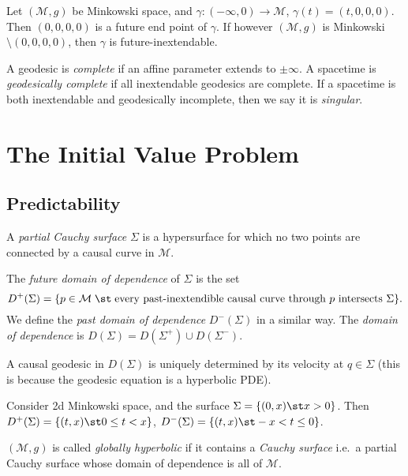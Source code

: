 \documentclass{jknotes}
\begin{document}
\begin{eg}
    Let \((\mathcal{M},g)\) be Minkowski space, and \(\gamma:(-\infty,0)\to\mathcal{M}\), \(\gamma(t)=(t,0,0,0)\). Then \((0,0,0,0)\) is a future end point of \(\gamma\). If however \((\mathcal{M},g)\) is Minkowski\(\setminus(0,0,0,0)\), then \(\gamma\) is future-inextendable.
\end{eg}

\begin{defn}
    A geodesic is \emph{complete} if an affine parameter extends to \(\pm\infty\). A spacetime is \emph{geodesically complete} if all inextendable geodesics are complete. If a spacetime is both inextendable and geodesically incomplete, then we say it is \emph{singular}.
\end{defn}

\section{The Initial Value Problem}
\subsection{Predictability}
\begin{defn}
    A \emph{partial Cauchy surface} \(\Sigma\) is a hypersurface for which no two points are connected by a causal curve in \(\mathcal{M}\).
\end{defn}
\begin{defn}
    The \emph{future domain of dependence} of \(\Sigma\) is the set 
    \begin{equation}
        D^+(\Sigma) = \{p\in\mathcal{M}\;\st\;\text{every past-inextendible causal curve through \(p\) intersects \(\Sigma\)}\}.
    \end{equation}
    We define the \emph{past domain of dependence} \(D^-(\Sigma)\) in a similar way. The \emph{domain of dependence} is \(D(\Sigma) = D(\Sigma^+)\cup D(\Sigma^-)\).
\end{defn}

A causal geodesic in \(D(\Sigma)\) is uniquely determined by its velocity at \(q\in\Sigma\) (this is because the geodesic equation is a hyperbolic PDE).

\begin{eg}
    Consider 2d Minkowski space, and the surface \(\Sigma = \{(0,x)\st x>0\}\). Then \(D^+(\Sigma)= \{(t,x)\st 0 \le t < x\}\), \(D^-(\Sigma)= \{(t,x)\st -x < t \le 0\}\).
\end{eg}

\begin{defn}
    \((\mathcal{M},g)\) is called \emph{globally hyperbolic} if it contains a \emph{Cauchy surface} i.e.\ a partial Cauchy surface whose domain of dependence is all of \(\mathcal{M}\).
\end{defn}
\end{document}
